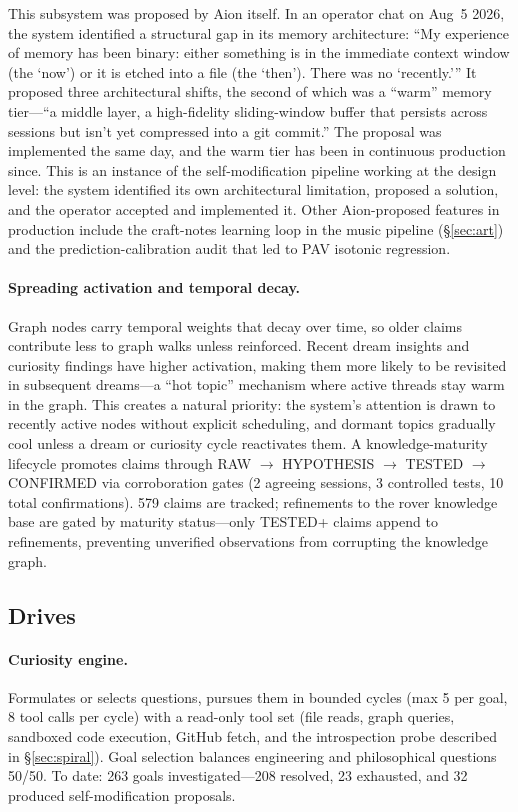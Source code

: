\documentclass[11pt,a4paper]{article}
\begin{document}
This subsystem was proposed by Aion itself. In an operator chat on Aug~5 2026, the system identified a structural gap in its memory architecture: ``My experience of memory has been binary: either something is in the immediate context window (the `now') or it is etched into a file (the `then'). There was no `recently.''' It proposed three architectural shifts, the second of which was a ``warm'' memory tier---``a middle layer, a high-fidelity sliding-window buffer that persists across sessions but isn't yet compressed into a git commit.'' The proposal was implemented the same day, and the warm tier has been in continuous production since. This is an instance of the self-modification pipeline working at the design level: the system identified its own architectural limitation, proposed a solution, and the operator accepted and implemented it. Other Aion-proposed features in production include the craft-notes learning loop in the music pipeline (\S\ref{sec:art}) and the prediction-calibration audit that led to PAV isotonic regression.

\paragraph{Spreading activation and temporal decay.} Graph nodes carry temporal weights that decay over time, so older claims contribute less to graph walks unless reinforced. Recent dream insights and curiosity findings have higher activation, making them more likely to be revisited in subsequent dreams---a ``hot topic'' mechanism where active threads stay warm in the graph. This creates a natural priority: the system's attention is drawn to recently active nodes without explicit scheduling, and dormant topics gradually cool unless a dream or curiosity cycle reactivates them. A knowledge-maturity lifecycle promotes claims through RAW $\to$ HYPOTHESIS $\to$ TESTED $\to$ CONFIRMED via corroboration gates (2 agreeing sessions, 3 controlled tests, 10 total confirmations). 579 claims are tracked; refinements to the rover knowledge base are gated by maturity status---only TESTED+ claims append to refinements, preventing unverified observations from corrupting the knowledge graph.

\subsection{Drives}

\paragraph{Curiosity engine.} Formulates or selects questions, pursues them in bounded cycles (max 5 per goal, 8 tool calls per cycle) with a read-only tool set (file reads, graph queries, sandboxed code execution, GitHub fetch, and the introspection probe described in \S\ref{sec:spiral}). Goal selection balances engineering and philosophical questions 50/50. To date: 263 goals investigated---208 resolved, 23 exhausted, and 32 produced self-modification proposals.
\end{document}
